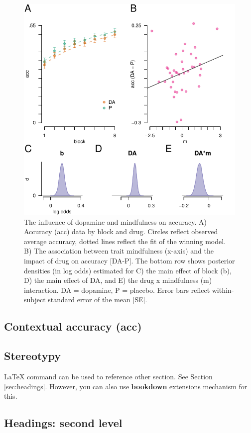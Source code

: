 \documentclass{article}
\begin{document}
\begin{figure}

{\centering \includegraphics[width=0.7\linewidth]{../../images/acc_fig} 

}

\caption{The influence of dopamine and mindfulness on accuracy. A) Accuracy (acc) data by block and drug. Circles reflect observed average accuracy, dotted lines reflect the fit of the winning model. B) The association between trait mindfulness (x-axis) and the impact of drug on accuracy [DA-P]. The bottom row shows posterior densities (in log odds) estimated for C) the main effect of block (b), D) the main effect of DA, and E) the drug x mindfulness (m) interaction. DA = dopamine, P = placebo. Error bars reflect within-subject standard error of the mean [SE].}\label{fig:accfig}
\end{figure}

\hypertarget{contextual-accuracy-acc}{%
\subsection{Contextual accuracy (acc)}\label{contextual-accuracy-acc}}

\hypertarget{stereotypy}{%
\subsection{Stereotypy}\label{stereotypy}}

LaTeX command can be used to reference other section. See Section
\ref{sec:headings}. However, you can also use \textbf{bookdown}
extensions mechanism for this.

\hypertarget{headings-second-level}{%
\subsection{Headings: second level}\label{headings-second-level}}
\end{document}
